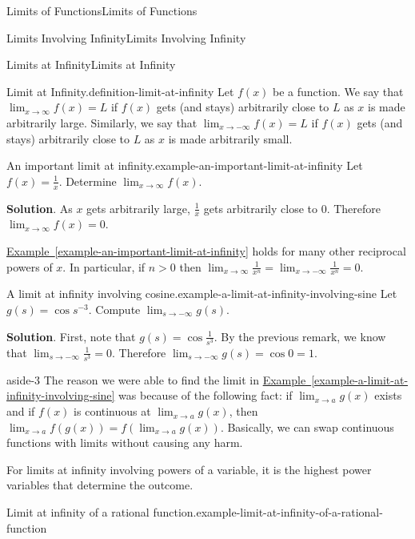 \documentclass[10pt,]{book}
\numberwithin{equation}{section}
\begin{document}
\begin{chapterptx}{Limits of Functions}{}{Limits of Functions}{}{}
\begin{sectionptx}{Limits Involving Infinity}{}{Limits Involving Infinity}{}{}
\begin{subsectionptx}{Limits at Infinity}{}{Limits at Infinity}{}{}
\begin{definition}{Limit at Infinity.}{definition-limit-at-infinity}
\hypertarget{p-60}{}%
Let \(f(x)\) be a function. We say that \(\lim_{x\to\infty}f(x) = L\) if \(f(x)\) gets (and stays) arbitrarily close to \(L\) as \(x\) is made arbitrarily large. Similarly, we say that \(\lim_{x\to-\infty}f(x) = L\) if \(f(x)\) gets (and stays) arbitrarily close to \(L\) as \(x\) is made arbitrarily small.%
\end{definition}
\begin{example}{An important limit at infinity.}{example-an-important-limit-at-infinity}%
\hypertarget{p-61}{}%
Let \(f(x) = \frac{1}{x}\). Determine \(\lim_{x\to\infty}f(x)\).%
\par\smallskip%
\noindent\textbf{Solution}.\hypertarget{solution-12}{}\quad%
\hypertarget{p-62}{}%
As \(x\) gets arbitrarily large, \(\frac{1}{x}\) gets arbitrarily close to \(0\). Therefore \(\lim_{x\to\infty}f(x) = 0\).%
\end{example}
\hypertarget{p-63}{}%
\hyperref[example-an-important-limit-at-infinity]{Example~\ref{example-an-important-limit-at-infinity}} holds for many other reciprocal powers of \(x\). In particular, if \(n>0\) then \(\lim_{x\to\infty}\frac{1}{x^{n}} = \lim_{x\to-\infty}\frac{1}{x^{n}} = 0\).%
\begin{example}{A limit at infinity involving cosine.}{example-a-limit-at-infinity-involving-sine}%
\hypertarget{p-64}{}%
Let \(g(s) = \cos s^{-3}\). Compute \(\lim_{s\to-\infty}g(s)\).%
\par\smallskip%
\noindent\textbf{Solution}.\hypertarget{solution-13}{}\quad%
\hypertarget{p-65}{}%
First, note that \(g(s) = \cos\frac{1}{s^{3}}\). By the previous remark, we know that \(\lim_{s\to-\infty}\frac{1}{s^{3}} = 0\). Therefore \(\lim_{s\to-\infty}g(s) = \cos0 = 1\).%
\end{example}
\begin{aside}{}{aside-3}%
\hypertarget{p-66}{}%
The reason we were able to find the limit in \hyperref[example-a-limit-at-infinity-involving-sine]{Example~\ref{example-a-limit-at-infinity-involving-sine}} was because of the following fact: if \(\lim_{x\to a}g(x)\) exists and if \(f(x)\) is continuous at \(\lim_{x\to a}g(x)\), then \(\lim_{x\to a}f(g(x)) = f(\lim_{x\to a}g(x))\). Basically, we can swap continuous functions with limits without causing any harm.%
\end{aside}
\hypertarget{p-67}{}%
For limits at infinity involving powers of a variable, it is the highest power variables that determine the outcome.%
\begin{example}{Limit at infinity of a rational function.}{example-limit-at-infinity-of-a-rational-function}%

\end{example}
\end{subsectionptx}
\end{sectionptx}
\end{chapterptx}
\end{document}
